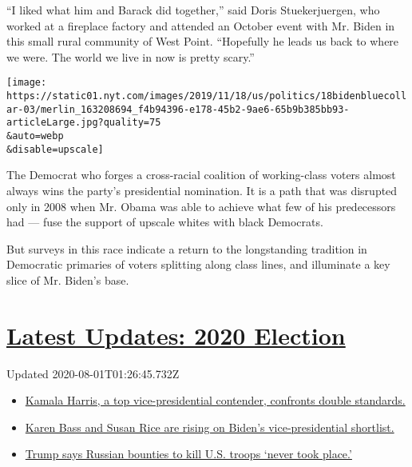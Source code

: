 ``I liked what him and Barack did together,'' said Doris Stuekerjuergen,
who worked at a fireplace factory and attended an October event with Mr.
Biden in this small rural community of West Point. ``Hopefully he leads
us back to where we were. The world we live in now is pretty scary.''

\texttt{[image: https://static01.nyt.com/images/2019/11/18/us/politics/18bidenbluecollar-03/merlin\_163208694\_f4b94396-e178-45b2-9ae6-65b9b385bb93-articleLarge.jpg?quality=75\\\&auto=webp\\\&disable=upscale]}

The Democrat who forges a cross-racial coalition of working-class voters
almost always wins the party's presidential nomination. It is a path
that was disrupted only in 2008 when Mr. Obama was able to achieve what
few of his predecessors had --- fuse the support of upscale whites with
black Democrats.

But surveys in this race indicate a return to the longstanding tradition
in Democratic primaries of voters splitting along class lines, and
illuminate a key slice of Mr. Biden's base.

\hypertarget{latest-updates-2020-election}{%
\section{\texorpdfstring{\href{https://www.nytimes.com/2020/07/31/us/elections/biden-vs-trump.html?action=click\&pgtype=Article\&state=default\&region=MAIN_CONTENT_1\&context=storylines_live_updates}{Latest
Updates: 2020
Election}}{Latest Updates: 2020 Election}}\label{latest-updates-2020-election}}

Updated 2020-08-01T01:26:45.732Z

\begin{itemize}
\tightlist
\item
  \href{https://www.nytimes.com/2020/07/31/us/elections/biden-vs-trump.html?action=click\&pgtype=Article\&state=default\&region=MAIN_CONTENT_1\&context=storylines_live_updates\#link-29fdff45}{Kamala
  Harris, a top vice-presidential contender, confronts double
  standards.}
\item
  \href{https://www.nytimes.com/2020/07/31/us/elections/biden-vs-trump.html?action=click\&pgtype=Article\&state=default\&region=MAIN_CONTENT_1\&context=storylines_live_updates\#link-13ec3d9c}{Karen
  Bass and Susan Rice are rising on Biden's vice-presidential
  shortlist.}
\item
  \href{https://www.nytimes.com/2020/07/31/us/elections/biden-vs-trump.html?action=click\&pgtype=Article\&state=default\&region=MAIN_CONTENT_1\&context=storylines_live_updates\#link-49e9a016}{Trump
  says Russian bounties to kill U.S. troops `never took place.'}
\end{itemize}

